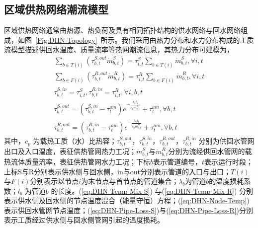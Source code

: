 \subsection{区域供热网络潮流模型}
\label{sec:st-case-dispatch-DHN}
区域供热网络通常由热源、热负荷及具有相同拓扑结构的供水网络与回水网络组成，如图~\ref{Fig:DHN-Topology}~所示。我们采用由热力分布和水力分布构成的工质流模型描述供回水温度、质量流率等热网潮流信息，其热力分布可建模为\cite{LXZ-DHN-2016, DHN-Model-17}，
\begin{subequations}
\label{eq:DHN-Thermal-Part}
\begin{gather}
\sum\limits_{b \in T(i)} {({\tau _{b,t}^{S,out}\dot m_{b,t}^S})}  = \tau _{i,t}^S\sum\limits_{b \in T(i)}{\dot m_{b,t}^S} ,\forall i,t \label{eq:DHN-Temp-Mix-S}\\
\sum\limits_{b \in F(i)} {({\tau _{b,t}^{R,out}\dot m_{b,t}^R})}  = \tau _{i,t}^R\sum\limits_{b \in F(i)}{\dot m_{b,t}^R} ,\forall i,t\label{eq:DHN-Temp-Mix-R}\\
\tau _{b,t}^{S,in} = \tau _{i,t}^S,\tau _{b,t}^{R,in} = \tau _{i,t}^R,\forall i,b,t \label{eq:DHN-Node-Temp}\\
\tau _{b,t}^{S,out} = ({\tau _{b,t}^{S,in} - \tau _t^{am}}){e^{-\frac{{{\lambda _b} {l_b}}}{{{c_p} \dot m_{b,t}^S}}}} + \tau _t^{am},\forall b,t\label{eq:DHN-Pipe-Loss-S}\\
\tau _{b,t}^{R,out} = ({\tau _{b,t}^{R,in} - \tau _t^{am}}){e^{ - \frac{{{\lambda _b}{l_b}}}{{{c_p}\dot m_{b,t}^R}}}} + \tau _t^{am},\forall b,t \label{eq:DHN-Pipe-Loss-R}
\end{gather}
\end{subequations}
其中，${c_p}$ 为载热工质（水）比热容；$\tau _{b,t}^{S,out}$，$\tau _{b,t}^{S,in}$，$\tau _{b,t}^{R,out}$，$\tau _{b,t}^{R,in}$ 分别为供回水管网出口及入口温度，表征供热管网热力工况；$\dot m_{b,t}^S$与$\dot m_{b,t}^R$分别为流经供回水管网的载热流体质量流率，表征供热管网水力工况；下标$b$表示管道编号，$t$表示运行时段；上标S与R分别表示供水侧与回水侧，in与out分别表示管道的入口与出口；$T(i)$ 与$F(i)$分别表示以节点$i$为末节点与首节点的管道集合；$\lambda_b$为管道$b$的温度损耗系数；$l_b$ 为管道$b$ 的长度。(\ref{eq:DHN-Temp-Mix-S}) 与(\ref{eq:DHN-Temp-Mix-R}) 分别表示供水侧及回水侧的节点温度混合（能量守恒）方程；(\ref{eq:DHN-Node-Temp}) 表示供回水管网节点温度；(\ref{eq:DHN-Pipe-Loss-S})与(\ref{eq:DHN-Pipe-Loss-R})分别表示工质经过供水侧与回水侧管网引起的温度损耗。

